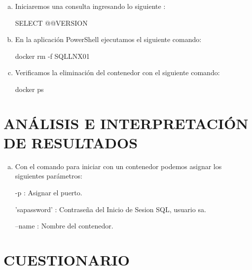 \documentclass[preprint,12pt]{elsarticle}
\begin{document}
\begin{enumerate}[a)]
\item Iniciaremos una consulta ingresando lo siguiente : 
\begin{center}SELECT @@VERSION\end{center}

\item En la aplicación PowerShell ejecutamos el siguiente comando:
\begin{center}docker rm -f SQLLNX01\end{center}
\item Verificamos la eliminación del contenedor con el siguiente comando:
\begin{center}docker ps\end{center}
\end{enumerate}

\section{ANÁLISIS E INTERPRETACIÓN DE RESULTADOS}
\begin{enumerate}[a)]
\item Con el comando para iniciar con un contenedor podemos asignar los siguientes parámetros:
\begin{center} -p : 	Asignar el puerto.\end{center}
\begin{center}'sapassword' : Contraseña del Inicio de Sesion SQL, usuario sa.\end{center}
\begin{center} --name : Nombre del contenedor.\end{center}
\end{enumerate}


\section{CUESTIONARIO}
\end{document}

